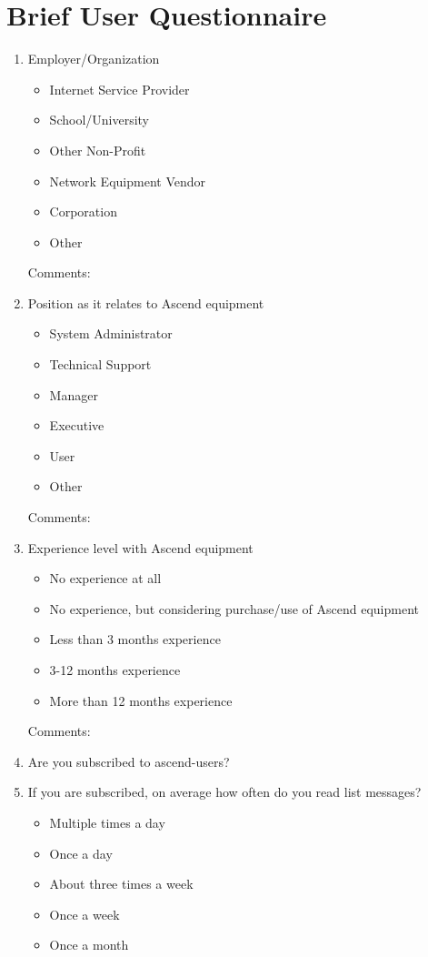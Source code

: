 \chapter{Brief User Questionnaire}
\label{cha:questionnaire-appendix}
\begin{enumerate}
\item Employer/Organization
  \begin{itemize}
  \item Internet Service Provider
  \item School/University
  \item Other Non-Profit
  \item Network Equipment Vendor
  \item Corporation
  \item Other
  \end{itemize}
  Comments:
\item Position as it relates to Ascend equipment
  \begin{itemize}
  \item System Administrator
  \item Technical Support
  \item Manager
  \item Executive
  \item User
  \item Other
  \end{itemize}
  Comments:
\item Experience level with Ascend equipment
  \begin{itemize}
  \item No experience at all
  \item No experience, but considering purchase/use of Ascend equipment
  \item Less than 3 months experience
  \item 3-12 months experience
  \item More than 12 months experience
  \end{itemize}
  Comments:
\item Are you subscribed to ascend-users?
\item If you are subscribed, on average how often do you read list messages?
  \begin{itemize}
  \item Multiple times a day
  \item Once a day
  \item About three times a week
  \item Once a week
  \item Once a month

\end{itemize}
\end{enumerate}
